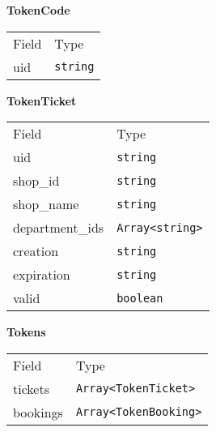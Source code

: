     \begin{table}[H]
    \centering
    \textbf{TokenCode}\\
    \everyrow{\tabucline[0.5pt]-}
    \begin{tabu} to 0.55\textwidth {|X|X|} \hline
    Field & Type \\
    uid & \texttt{string} \\
\end{tabu}
\end{table}


    \begin{table}[H]
    \centering
    \textbf{TokenTicket}\\
    \everyrow{\tabucline[0.5pt]-}
    \begin{tabu} to 0.55\textwidth {|X|X|} \hline
    Field & Type \\
    uid & \texttt{string} \\
shop\_id & \texttt{string} \\
shop\_name & \texttt{string} \\
department\_ids & \texttt{Array<string>} \\
creation & \texttt{string} \\
expiration & \texttt{string} \\
valid & \texttt{boolean} \\
\end{tabu}
\end{table}


    \begin{table}[H]
    \centering
    \textbf{Tokens}\\
    \everyrow{\tabucline[0.5pt]-}
    \begin{tabu} to 0.55\textwidth {|X|X|} \hline
    Field & Type \\
    tickets & \texttt{Array<TokenTicket>} \\
bookings & \texttt{Array<TokenBooking>} \\
\end{tabu}
\end{table}


